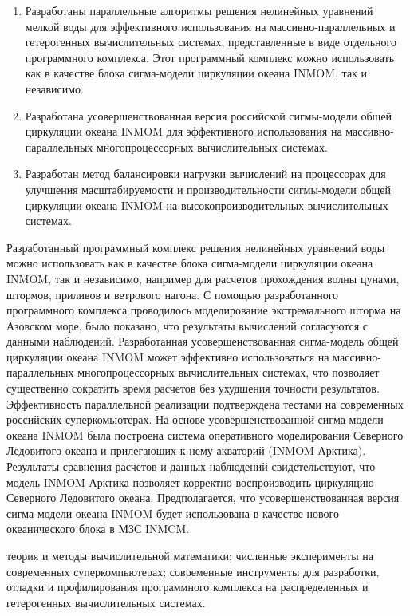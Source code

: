 {\novelty}
\begin{enumerate}[beginpenalty=10000] %
    \item Разработаны параллельные алгоритмы решения нелинейных уравнений мелкой воды для эффективного использования на массивно-параллельных и гетерогенных вычислительных системах, представленные в виде отдельного программного комплекса. Этот программный комплекс можно использовать как в качестве блока сигма-модели циркуляции океана INMOM, так и независимо.
    \item Разработана усовершенствованная версия российской сигмы-модели общей циркуляции океана INMOM для эффективного использования на массивно-параллельных многопроцессорных вычислительных системах.
    \item Разработан метод балансировки нагрузки вычислений на процессорах для улучшения масштабируемости и производительности сигмы-модели общей циркуляции океана INMOM на высокопроизводительных вычислительных системах.
\end{enumerate}

{\influence}
Разработанный программный комплекс решения нелинейных уравнений воды можно использовать как в качестве блока сигма-модели циркуляции океана INMOM, так и независимо, например для расчетов прохождения волны цунами, штормов, приливов и ветрового нагона. С помощью разработанного программного комплекса проводилось моделирование экстремального шторма на Азовском море, было показано, что результаты вычислений согласуются с данными наблюдений.
Разработанная усовершенствованная сигма-модель общей циркуляции океана INMOM может эффективно использоваться на массивно-параллельных многопроцессорных вычислительных системах, что позволяет существенно сократить время расчетов без ухудшения точности результатов. Эффективность параллельной реализации подтверждена тестами на современных российских суперкомьютерах. На основе усовершенствованной сигма-модели океана INMOM была построена система оперативного моделирования Северного Ледовитого океана и прилегающих к нему акваторий (INMOM-Арктика). Результаты сравнения расчетов и данных наблюдений свидетельствуют, что модель INMOM-Арктика позволяет корректно воспроизводить циркуляцию Северного Ледовитого океана.
Предполагается, что усовершенствованная версия сигма-модели океана INMOM будет использована в качестве нового океанического блока в МЗС INMCM.

{\methods} теория и методы вычислительной математики; численные эксперименты на современных суперкомпьютерах; современные инструменты для разработки, отладки и профилирования программного комплекса на распределенных и гетерогенных вычислительных системах.

